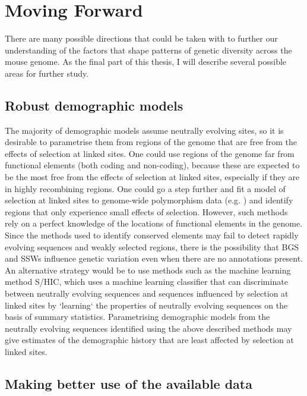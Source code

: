 \section{Moving Forward}	

	There are many possible directions that could be taken with to further our understanding of the factors that shape patterns of genetic diversity across the mouse genome. As the final part of this thesis, I will describe several possible areas for further study.
	
\subsection{Robust demographic models}

	The majority of demographic models assume neutrally evolving sites, so it is desirable to parametrise them from regions of the genome that are free from the effects of selection at linked sites. One could use regions of the genome far from functional elements (both coding and non-coding), because these are expected to be the most free from the effects of selection at linked sites, especially if they are in highly recombining regions. One could go a step further and fit a model of selection at linked sites to genome-wide polymorphism data (e.g. \citealt{RN274}) and identify regions that only experience small effects of selection. However, such methods rely on a perfect knowledge of the locations of functional elements in the genome. Since the methods used to identify conserved elements may fail to detect rapidly evolving sequences and weakly selected regions, there is the possibility that BGS and SSWs influence genetic variation even when there are no annotations present. An alternative strategy would be to use methods such as the machine learning method S/HIC, which uses a machine learning classifier that can discriminate between neutrally evolving sequences and sequences influenced by selection at linked sites by `learning` the properties of neutrally evolving sequences on the basis of summary statistics. Parametrising demographic models from the neutrally evolving sequences identified using the above described methods may give estimates of the demographic history that are least affected by selection at linked sites. 

\subsection{Making better use of the available data}

